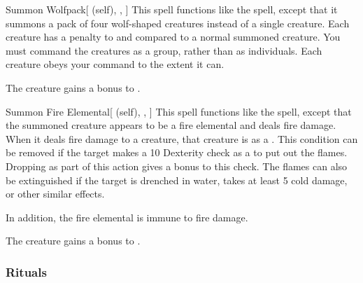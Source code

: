 \lowercase{\hypertarget{spell:Summon Wolfpack}{}}\label{spell:Summon Wolfpack}
\begin{attuneability}[Rank 5]{\hypertarget{spell:Summon Wolfpack}{Summon Wolfpack}}[ (self), , ]
This spell functions like the  spell, except that it summons a pack of four wolf-shaped creatures instead of a single creature.
Each creature has a  penalty to  and  compared to a normal summoned creature.
You must command the creatures as a group, rather than as individuals.
Each creature obeys your command to the extent it can.

\rankline
{} The creature gains a  bonus to .
\end{attuneability}
\vspace{0.25em}



\lowercase{\hypertarget{spell:Summon Fire Elemental}{}}\label{spell:Summon Fire Elemental}
\begin{attuneability}[Rank 6]{\hypertarget{spell:Summon Fire Elemental}{Summon Fire Elemental}}[ (self), , ]
This spell functions like the  spell, except that the summoned creature appears to be a fire elemental and deals fire damage.
When it deals fire damage to a creature, that creature is  as a .
This condition can be removed if the target makes a  10 Dexterity check as a  to put out the flames.
Dropping  as part of this action gives a  bonus to this check.
The flames can also be extinguished if the target is drenched in water, takes at least 5 cold damage, or other similar effects.

In addition, the fire elemental is immune to fire damage.

\rankline
{} The creature gains a  bonus to .
\end{attuneability}
\vspace{0.25em}



\subsubsection{Rituals}


